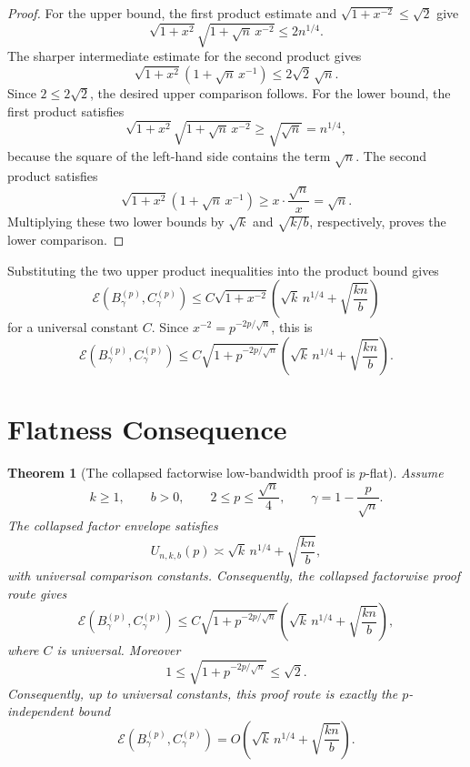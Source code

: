 \documentclass[11pt]{article}
\newtheorem{theorem}{Theorem}
\newcommand{\Eerr}{\mathcal E}
\begin{document}
\begin{proof}
For the upper bound, the first product estimate and \(\sqrt{1+x^{-2}}\le\sqrt2\) give
\[
    \sqrt{1+x^2}\sqrt{1+\sqrt n\,x^{-2}}
    \le
    2n^{1/4}.
\]
The sharper intermediate estimate for the second product gives
\[
    \sqrt{1+x^2}(1+\sqrt n\,x^{-1})
    \le
    2\sqrt2\,\sqrt n.
\]
Since \(2\le2\sqrt2\), the desired upper comparison follows.
For the lower bound, the first product satisfies
\[
    \sqrt{1+x^2}\sqrt{1+\sqrt n\,x^{-2}}
    \ge
    \sqrt{\sqrt n}
    =
    n^{1/4},
\]
because the square of the left-hand side contains the term \(\sqrt n\).
The second product satisfies
\[
    \sqrt{1+x^2}(1+\sqrt n\,x^{-1})
    \ge
    x\cdot\frac{\sqrt n}{x}
    =
    \sqrt n.
\]
Multiplying these two lower bounds by \(\sqrt k\) and \(\sqrt{k/b}\), respectively, proves the lower comparison.
\end{proof}

Substituting the two upper product inequalities into the product bound gives
\[
    \Eerr(B_\gamma^{(p)},C_\gamma^{(p)})
    \le
    C
    \sqrt{1+x^{-2}}
    \left(
        \sqrt{k}\,n^{1/4}
        +
        \sqrt{\frac{kn}{b}}
    \right)
\]
for a universal constant \(C\).
Since \(x^{-2}=p^{-2p/\sqrt n}\), this is
\[
    \Eerr(B_\gamma^{(p)},C_\gamma^{(p)})
    \le
    C
    \sqrt{1+p^{-2p/\sqrt n}}
    \left(
        \sqrt{k}\,n^{1/4}
        +
        \sqrt{\frac{kn}{b}}
    \right).
\]

\section{Flatness Consequence}

\begin{theorem}[The collapsed factorwise low-bandwidth proof is \(p\)-flat]
Assume
\[
    k\ge1,
    \qquad
    b>0,
    \qquad
    2\le p\le \frac{\sqrt n}{4},
    \qquad
    \gamma=1-\frac{p}{\sqrt n}.
\]
The collapsed factor envelope satisfies
\[
    U_{n,k,b}(p)
    \asymp
    \sqrt{k}\,n^{1/4}
    +
    \sqrt{\frac{kn}{b}},
\]
with universal comparison constants.
Consequently, the collapsed factorwise proof route gives
\[
    \Eerr(B_\gamma^{(p)},C_\gamma^{(p)})
    \le
    C
    \sqrt{1+p^{-2p/\sqrt n}}
    \left(
        \sqrt{k}\,n^{1/4}
        +
        \sqrt{\frac{kn}{b}}
    \right),
\]
where \(C\) is universal.
Moreover
\[
    1
    \le
    \sqrt{1+p^{-2p/\sqrt n}}
    \le
    \sqrt2.
\]
Consequently, up to universal constants, this proof route is exactly the \(p\)-independent bound
\[
    \Eerr(B_\gamma^{(p)},C_\gamma^{(p)})
    =
    O\!\left(
        \sqrt{k}\,n^{1/4}
        +
        \sqrt{\frac{kn}{b}}
    \right).
\]
\end{theorem}
\end{document}
